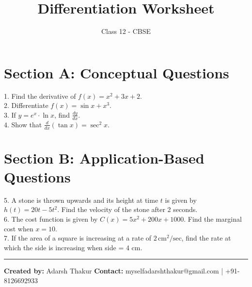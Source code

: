 \documentclass[12pt]{article}
\title{Differentiation Worksheet}
\author{Class 12 - CBSE}
\date{}
\begin{document}
\maketitle

\section*{Section A: Conceptual Questions}

1. Find the derivative of \( f(x) = x^2 + 3x + 2 \). \\
2. Differentiate \( f(x) = \sin x + x^3 \). \\
3. If \( y = e^x \cdot \ln x \), find \( \frac{dy}{dx} \). \\
4. Show that \( \frac{d}{dx} (\tan x) = \sec^2 x \). \\

\section*{Section B: Application-Based Questions}

5. A stone is thrown upwards and its height at time \( t \) is given by \( h(t) = 20t - 5t^2 \).  
   Find the velocity of the stone after 2 seconds. \\

6. The cost function is given by \( C(x) = 5x^2 + 200x + 1000 \).  
   Find the marginal cost when \( x = 10 \). \\

7. If the area of a square is increasing at a rate of \( 2 \, \text{cm}^2/\text{sec} \), find the rate at which the side is increasing when side = 4 cm. \\

\vspace{1cm}
\noindent\rule{\textwidth}{0.4pt}
\vspace{0.2cm}

\textbf{Created by:} Adarsh Thakur  
\textbf{Contact:} myselfadarshthakur@gmail.com | +91-8126692933  
\end{document}
